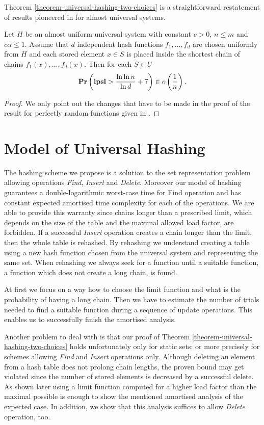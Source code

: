 \documentclass[runningheads,a4paper]{llncs}
\begin{document}
Theorem \ref{theorem-universal-hashing-two-choices} is a straightforward restatement of results pioneered in \cite{DBLP:conf/stoc/AzarBKU94} for almost universal systems.

\begin{theorem}
\label{theorem-universal-hashing-two-choices}
Let $H$ be an almost uniform universal system with constant $c > 0$, $n \leq m$ and $c \alpha \leq 1$. Assume that $d$ independent hash functions $f_1, \dots, f_d$ are chosen uniformly from $H$ and each stored element $x \in S$ is placed inside the shortest chain of chains $f_1(x), \dots, f_d(x)$. Then for each $S \in U$ $$\mathbf{Pr}\left(\mathbf{lpsl} > \frac{\ln \ln n}{\ln d} + 7\right) \in o\left(\frac{1}{n}\right).$$
\end{theorem}
\begin{proof}
We only point out the changes that have to be made in the proof of the result for perfectly random functions given in \cite{Mitzenmacher:2005:PCR:1076315}. 
\end{proof}

\section{Model of Universal Hashing}
\label{section-model}
The hashing scheme we propose is a solution to the set representation problem allowing operations \emph{Find}, \emph{Insert} and \emph{Delete}. Moreover our model of hashing guarantees a double-logarithmic worst-case time for Find operation and has constant expected amortised time complexity for each of the operations. We are able to provide this warranty since chains longer than a prescribed limit, which depends on the size of the table and the maximal allowed load factor, are forbidden. If a successful \emph{Insert} operation creates a chain longer than the limit, then the whole table is rehashed. By rehashing we understand creating a table using a new hash function chosen from the universal system and representing the same set. When rehashing we always seek for a function until a suitable function, a function which does not create a long chain, is found. 

At first we focus on a way how to choose the limit function and what is the probability of having a long chain. Then we have to estimate the number of trials needed to find a suitable function during a sequence of update operations. This enables us to successfully finish the amortised analysis.

Another problem to deal with is that our proof of Theorem \ref{theorem-universal-hashing-two-choices} holds unfortunately only for static sets; or more precisely for schemes allowing \emph{Find} and \emph{Insert} operations only. Although deleting an element from a hash table does not prolong chain lengths, the proven bound may get violated since the number of stored elements is decreased by a successful delete. As shown later using a limit function computed for a higher load factor than the maximal possible is enough to show the mentioned amortised analysis of the expected case. In addition, we show that this analysis suffices to allow \emph{Delete} operation, too. 
\end{document}
